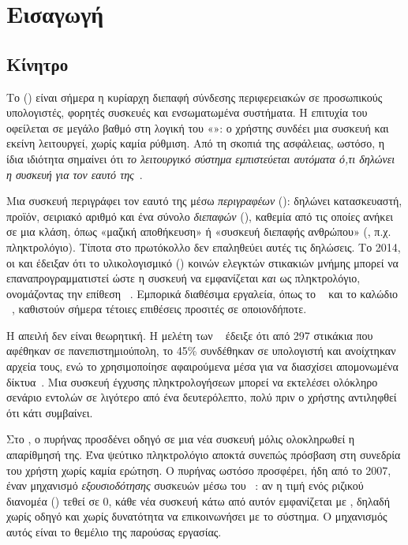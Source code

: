 \chapter{Εισαγωγή}
\label{ch:intro}

\section{Κίνητρο}
\label{sec:motivation}

Το  () είναι σήμερα η κυρίαρχη διεπαφή σύνδεσης
περιφερειακών σε προσωπικούς υπολογιστές, φορητές συσκευές και ενσωματωμένα
συστήματα. Η επιτυχία του οφείλεται σε μεγάλο βαθμό στη λογική του
«»: ο χρήστης συνδέει μια συσκευή και εκείνη λειτουργεί, χωρίς
καμία ρύθμιση. Από τη σκοπιά της ασφάλειας, ωστόσο, η ίδια ιδιότητα σημαίνει ότι
\emph{το λειτουργικό σύστημα εμπιστεύεται αυτόματα ό,τι δηλώνει η συσκευή για τον
εαυτό της}~\cite{tian2018sok}.

Μια συσκευή  περιγράφει τον εαυτό της μέσω \emph{περιγραφέων}
(): δηλώνει κατασκευαστή, προϊόν, σειριακό αριθμό και ένα σύνολο
\emph{διεπαφών} (), καθεμία από τις οποίες ανήκει σε μια κλάση,
όπως «μαζική αποθήκευση» ή «συσκευή διεπαφής ανθρώπου» (, π.χ.
πληκτρολόγιο). Τίποτα στο πρωτόκολλο δεν επαληθεύει αυτές τις δηλώσεις. Το 2014,
οι  και  έδειξαν ότι το υλικολογισμικό () κοινών
ελεγκτών στικακιών μνήμης μπορεί να επαναπρογραμματιστεί ώστε η συσκευή να
εμφανίζεται \emph{και} ως πληκτρολόγιο, ονομάζοντας την επίθεση
~\cite{nohl2014badusb}. Εμπορικά διαθέσιμα εργαλεία, όπως το
~\cite{hak5ducky} και το καλώδιο ~\cite{omgcable},
καθιστούν σήμερα τέτοιες επιθέσεις προσιτές σε οποιονδήποτε.

Η απειλή δεν είναι θεωρητική. Η μελέτη των ~\cite{tischer2016usbdrop}
έδειξε ότι από 297 στικάκια που αφέθηκαν σε πανεπιστημιούπολη, το 45\% συνδέθηκαν
σε υπολογιστή και ανοίχτηκαν αρχεία τους, ενώ το  χρησιμοποίησε
αφαιρούμενα μέσα  για να διασχίσει απομονωμένα δίκτυα~\cite{falliere2011stuxnet}.
Μια συσκευή έγχυσης πληκτρολογήσεων μπορεί να εκτελέσει ολόκληρο σενάριο εντολών
σε λιγότερο από ένα δευτερόλεπτο, πολύ πριν ο χρήστης αντιληφθεί ότι κάτι συμβαίνει.

Στο , ο πυρήνας προσδένει οδηγό σε μια νέα συσκευή μόλις ολοκληρωθεί η
απαρίθμησή της. Ένα ψεύτικο πληκτρολόγιο αποκτά συνεπώς πρόσβαση στη συνεδρία του
χρήστη χωρίς καμία ερώτηση. Ο πυρήνας ωστόσο προσφέρει, ήδη από το 2007, έναν
μηχανισμό \emph{εξουσιοδότησης} συσκευών μέσω του ~\cite{kernel-usb-authorization}:
αν η τιμή  ενός ριζικού διανομέα () τεθεί
σε 0, κάθε νέα συσκευή κάτω από αυτόν εμφανίζεται με , δηλαδή
χωρίς οδηγό και χωρίς δυνατότητα να επικοινωνήσει με το σύστημα. Ο μηχανισμός
αυτός είναι το θεμέλιο της παρούσας εργασίας.


